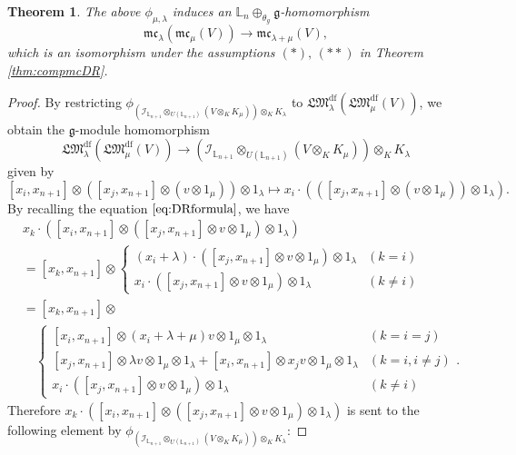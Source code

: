 \documentclass[a4paper,12pt]{article}
\newtheorem{thm}{Theorem}[section]
\theoremstyle{definition}
\theoremstyle{remark}
\begin{document}
\begin{thm}\label{thm:compmc2}
The above $\phi_{\mu,\lambda}$ 
induces an $\mathbb{L}_{n}\oplus_{\theta_{g}}\mathfrak{g}$-homomorphism 
\[
	\mathfrak{mc}_{\lambda}(
	\mathfrak{mc}_{\mu}(V))
	\rightarrow 
	\mathfrak{mc}_{\lambda+\mu}(V),
\]
which is an isomorphism under the assumptions $(*),\,(**)$ in Theorem \ref{thm:compmcDR}.
\end{thm}
\begin{proof}
By restricting $\phi_{(\mathcal{I}_{\mathbb{L}_{n+1}}\otimes_{U(\mathbb{L}_{n+1})} (V\otimes_{K}K_{\mu}))\otimes_{K} K_{\lambda}}$
to $\mathfrak{LM}_{\lambda}^{\mathrm{df}}(
\mathfrak{LM}_{\mu}^{\mathrm{df}}(V))$,
we obtain the $\mathfrak{g}$-module homomorphism 
\[
	\mathfrak{LM}_{\lambda}^{\mathrm{df}}(
	\mathfrak{LM}_{\mu}^{\mathrm{df}}(V))
	\rightarrow 
	(\mathcal{I}_{\mathbb{L}_{n+1}}\otimes_{U(\mathbb{L}_{n+1})}
	(V\otimes_{K} K_{\mu}))\otimes_{K}K_{\lambda}
\]
given by 
\[
	[x_{i},x_{n+1}]\otimes
	([x_{j},x_{n+1}]\otimes (v\otimes 1_{\mu}))\otimes 1_{\lambda}
	\mapsto 
	x_{i}\cdot (([x_{j},x_{n+1}]\otimes (v\otimes 1_{\mu}))\otimes 1_{\lambda}).
\]
By recalling the equation $\eqref{eq:DRformula}$,
we have 
\begin{align*}
&x_{k}\cdot([x_{i},x_{n+1}]\otimes
	([x_{j},x_{n+1}]\otimes v\otimes 1_{\mu})\otimes 1_{\lambda})\\
	&=[x_{k},x_{n+1}]\otimes 
	\begin{cases}
	(x_{i}+\lambda)\cdot([x_{j},x_{n+1}]\otimes v\otimes 1_{\mu})\otimes 1_{\lambda}
	&(k=i)\\
	x_{i}\cdot ([x_{j},x_{n+1}]\otimes v\otimes 1_{\mu})\otimes 1_{\lambda}
	&(k\neq i)
	\end{cases}\\
	&=[x_{k},x_{n+1}]\otimes\\
	&\quad \begin{cases}
	[x_{i},x_{n+1}]\otimes (x_{i}+\lambda+\mu)v \otimes1_{\mu}\otimes 1_{\lambda}
	&(k=i=j)\\
	[x_{j},x_{n+1}]\otimes \lambda v\otimes 1_{\mu}\otimes 1_{\lambda}+
	[x_{i},x_{n+1}]\otimes x_{j}v\otimes 1_{\mu}\otimes 1_{\lambda}
	&(k=i, i\neq j)\\
	x_{i}\cdot ([x_{j},x_{n+1}]\otimes v\otimes 1_{\mu})\otimes 1_{\lambda}
	&(k\neq i)
	\end{cases}.
\end{align*}
Therefore $x_{k}\cdot([x_{i},x_{n+1}]\otimes
	([x_{j},x_{n+1}]\otimes v\otimes 1_{\mu})\otimes 1_{\lambda})$
	is sent to the following element
	by $\phi_{(\mathcal{I}_{\mathbb{L}_{n+1}}\otimes_{U(\mathbb{L}_{n+1})} (V\otimes_{K}K_{\mu}))\otimes_{K} K_{\lambda}}$:

\end{proof}
\end{document}
